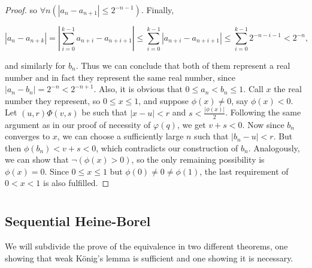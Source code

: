 \documentclass[../main.tex]{memoir}
\begin{document}
\begin{proof}
  so $\forall n (|a_n - a_{n + 1}| \le 2^{-n - 1})$. Finally,

  \[ |a_n - a_{n + k}| = \left\lvert \sum_{i = 0}^{k - 1} a_{n + i} - a_{n + i + 1} \right\rvert \le \sum_{i = 0}^{k - 1} |a_{n + i} - a_{n + i + 1}| \le \sum_{i = 0}^{k - 1} 2^{- n - i - 1} < 2^{-n}, \]

  and similarly for $b_n$. Thus we can conclude that both of them represent a real number and in fact they represent the same real number, since $|a_n - b_n| = 2^{-n} < 2^{-n + 1}$. Also, it is obvious that $0 \le a_n < b_n \le 1$. Call $x$ the real number they represent, so $0 \le x \le 1$, and suppose $\phi(x) \ne 0$, say $\phi(x) < 0$. Let $(u, r)\Phi(v, s)$ be such that $|x - u| < r$ and $s < \frac{|\phi(x)|}{2}$. Following the same argument as in our proof of necessity of $\varphi(q)$, we get $v + s < 0$. Now since $b_n$ converges to $x$, we can choose a sufficiently large $n$ such that $|b_n - u| < r$. But then $\phi(b_n) < v + s < 0$, which contradicts our construction of $b_n$. Analogously, we can show that $\neg(\phi(x) > 0)$, so the only remaining possibility is $\phi(x) = 0$. Since $0 \le x \le 1$ but $\phi(0) \ne 0 \ne \phi(1)$, the last requirement of $0 < x < 1$ is also fulfilled.
\end{proof}

\section{\wkl}

\subsection{Sequential Heine-Borel}

We will subdivide the prove of the equivalence in two different theorems, one showing that weak König's lemma is sufficient and one showing it is necessary.
\end{document}
